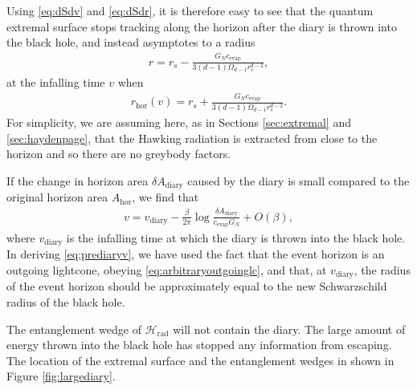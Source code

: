 \documentclass[12pt]{article}
\begin{document}
Using \eqref{eq:dSdv} and \eqref{eq:dSdr}, it is therefore easy to see that the quantum extremal surface stops tracking along the horizon after the diary is thrown into the black hole, and instead asymptotes to a radius
\begin{align} \label{eq:prediaryr}
r = r_s - \frac{G_N c_\text{evap}}{3 (d-1) \Omega_{d-1} r_s^{d-2}},
\end{align}
at the infalling time $v$ when
\begin{align}
r_\text{hor}(v) = r_s + \frac{G_N c_\text{evap}}{3 (d-1) \Omega_{d-1} r_s^{d-2}}.
\end{align}
For simplicity, we are assuming here, as in Sections \ref{sec:extremal} and \ref{sec:haydenpage}, that the Hawking radiation is extracted from close to the horizon and so there are no greybody factors. 

If the change in horizon area $\delta A_\text{diary}$ caused by the diary is small compared to the original horizon area $A_\text{hor}$, we find that
\begin{align} \label{eq:prediaryv}
v = v_\text{diary} - \frac{\beta}{2\pi} \log \frac{\delta A_\text{diary}}{c_\text{evap} G_N} + O(\beta),
\end{align}
where $v_\text{diary}$ is the infalling time at which the diary is thrown into the black hole. In deriving \eqref{eq:prediaryv}, we have used the fact that the event horizon is an outgoing lightcone, obeying \eqref{eq:arbitraryoutgoinglc}, and that, at $v_\text{diary}$, the radius of the event horizon should be approximately equal to the new Schwarzschild radius of the black hole.

The entanglement wedge of $\mathcal{H}_\text{rad}$ will not contain the diary. The large amount of energy thrown into the black hole has stopped any information from escaping. The location of the extremal surface and the entanglement wedges in shown in Figure \ref{fig:largediary}.
\end{document}
